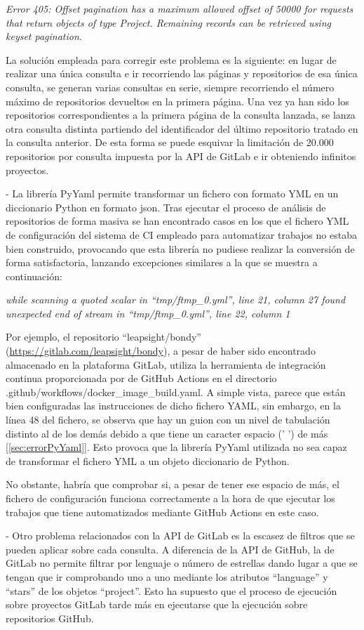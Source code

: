 \textit{Error 405: Offset pagination has a maximum allowed offset of 50000 for requests that return objects of type Project. Remaining records can be retrieved using keyset pagination.}

La solución empleada para corregir este problema es la siguiente: en lugar de realizar una única consulta e ir recorriendo las páginas y repositorios de esa única consulta, se generan varias consultas en serie, siempre recorriendo el número máximo de repositorios devueltos en la primera página. Una vez ya han sido los repositorios correspondientes a la primera página de la consulta lanzada, se lanza otra consulta distinta partiendo del identificador del último repositorio tratado en la consulta anterior. De esta forma se puede esquivar la limitación de 20.000 repositorios por consulta impuesta por la API de GitLab e ir obteniendo infinitos proyectos.

- La librería PyYaml permite transformar un fichero con formato YML en un diccionario Python en formato json. Tras ejecutar el proceso de análisis de repositorios de forma masiva se han encontrado casos en los que el fichero YML de configuración del sistema de CI empleado para automatizar trabajos no estaba bien construido, provocando que esta librería no pudiese realizar la conversión de forma satisfactoria, lanzando excepciones similares a la que se muestra a continuación:

\textit{while scanning a quoted scalar in ``tmp/ftmp\_0.yml'', line 21, column 27 found unexpected end of stream in ``tmp/ftmp\_0.yml'', line 22, column 1}

Por ejemplo, el repositorio ``leapsight/bondy'' (\url{https://gitlab.com/leapsight/bondy}), a pesar de haber sido encontrado almacenado en la plataforma GitLab, utiliza la herramienta de integración continua proporcionada por de GitHub Actions en el directorio .github/workflows/docker\_image\_build.yaml. A simple vista, parece que están bien configuradas las instrucciones de dicho fichero YAML, sin embargo, en la línea 48 del fichero, se observa que hay un guion con un nivel de tabulación distinto al de los demás debido a que tiene un caracter espacio (' ') de más [\ref{sec:errorPyYaml}]. Esto provoca que la librería PyYaml utilizada no sea capaz de transformar el fichero YML a un objeto diccionario de Python. 

No obstante, habría que comprobar si, a pesar de tener ese espacio de más, el fichero de configuración funciona correctamente a la hora de que ejecutar los trabajos que tiene automatizados mediante GitHub Actions en este caso.

- Otro problema relacionados con la API de GitLab es la escasez de filtros que se pueden aplicar sobre cada consulta. A diferencia de la API de GitHub, la de GitLab no permite filtrar por lenguaje o número de estrellas dando lugar a que se tengan que ir comprobando uno a uno mediante los atributos ``language'' y ``stars'' de los objetos ``project''. Esto ha supuesto que el proceso de ejecución sobre proyectos GitLab tarde más en ejecutarse que la ejecución sobre repositorios GitHub.